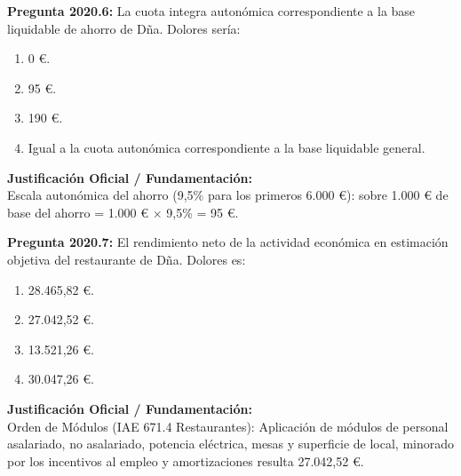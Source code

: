 \documentclass[11pt,a4paper,openany]{article}
\begin{document}
\noindent\textbf{\sffamily Pregunta 2020.6:} La cuota integra autonómica correspondiente a la base liquidable de ahorro de Dña. Dolores sería:\\[0.15cm]
\begin{enumerate}[label=\textbf{\alph*)},leftmargin=1.8em,itemsep=1.5pt,topsep=2pt,partopsep=0pt,parsep=0pt]
    \item 0 \euro{}.
    \item 95 \euro{}.
    \item 190 \euro{}.
    \item Igual a la cuota autonómica correspondiente a la base liquidable general.
\end{enumerate}
\begin{solucionBox}
\textbf{Justificación Oficial / Fundamentación:}\\[0.1cm]
Escala autonómica del ahorro (9,5\% para los primeros 6.000 \euro{}): sobre 1.000 \euro{} de base del ahorro = 1.000 \euro{} $\times$  9,5\% = 95 \euro{}.
\end{solucionBox}
\vspace{0.35cm}

\noindent\textbf{\sffamily Pregunta 2020.7:} El rendimiento neto de la actividad económica en estimación objetiva del restaurante de Dña. Dolores es:\\[0.15cm]
\begin{enumerate}[label=\textbf{\alph*)},leftmargin=1.8em,itemsep=1.5pt,topsep=2pt,partopsep=0pt,parsep=0pt]
    \item 28.465,82 \euro{}.
    \item 27.042,52 \euro{}.
    \item 13.521,26 \euro{}.
    \item 30.047,26 \euro{}.
\end{enumerate}
\begin{solucionBox}
\textbf{Justificación Oficial / Fundamentación:}\\[0.1cm]
Orden de Módulos (IAE 671.4 Restaurantes): Aplicación de módulos de personal asalariado, no asalariado, potencia eléctrica, mesas y superficie de local, minorado por los incentivos al empleo y amortizaciones resulta 27.042,52 \euro{}.
\end{solucionBox}
\vspace{0.35cm}
\end{document}
